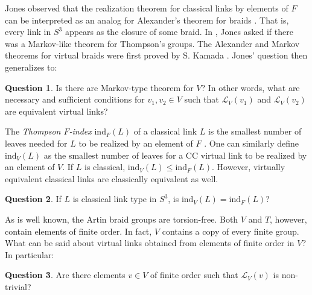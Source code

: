 \documentclass[11pt, twoside]{amsart}
\numberwithin{equation}{section}
\theoremstyle{definition}
\newtheorem{question}{Question}[section]
\numberwithin{equation}{section}
\begin{document}
Jones observed that the realization theorem for classical links by elements of $F$ can be interpreted as an analog for Alexander's theorem for braids \cite{jones_unitary}. That is, every link in $S^3$ appears as the closure of some braid. In \cite{jones18}, Jones asked if there was a Markov-like theorem for Thompson's groups. The Alexander and Markov theorems for virtual braids were first proved by S. Kamada \cite{s_kamada_07}. Jones' question then generalizes to:

\begin{question} Is there are Markov-type theorem for $V$? In other words, what are necessary and sufficient conditions for $v_1,v_2 \in V$ such that $\mathscr{L}_V(v_1)$ and $\mathscr{L}_V(v_2)$ are equivalent virtual links?  
\end{question}

The \emph{Thompson $F$-index} $\text{ind}_F(L)$ of a classical link $L$ is the smallest number of leaves needed for $L$ to be realized by an element of $F$ \cite{jones_unitary,jones_no_go}. One can similarly define $\text{ind}_V(L)$ as the smallest number of leaves for a CC virtual link to be realized by an element of $V$. If $L$ is classical, $\text{ind}_V(L) \le \text{ind}_F(L)$. However, virtually equivalent classical links are classically equivalent as well.

\begin{question} If $L$ is classical link type in $S^3$, is $\text{ind}_V(L)= \text{ind}_F(L)$?
\end{question}

As is well known, the Artin braid groups are torsion-free. Both $V$ and $T$, however, contain elements of finite order. In fact, $V$ contains a copy of every finite group. What can be said about virtual links obtained from elements of finite order in $V$? In particular:
\begin{question} Are there elements $v \in V$ of finite order such that $\mathscr{L}_V(v)$ is non-trivial?
\end{question}



\end{document}
